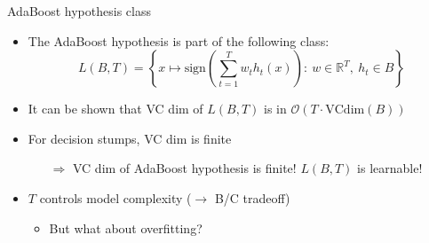 \begin{frame}{AdaBoost hypothesis class}
    \begin{itemize} \pause
        \item The AdaBoost hypothesis is part of the following class:
        \begin{equation*}
            L(B, T) = \left \{ x \mapsto \text{sign} \left( \sum_{t=1}^T w_t h_t(x) \right): \ 
        w \in \mathbb{R}^T, \  h_t \in B \right \}
        \end{equation*} \pause
        \item It can be shown that VC dim of $L(B, T)$ is in 
            $\mathcal{O}(T \cdot \text{VCdim}(B))$ \pause
        \item For decision stumps, VC dim is finite \pause
        \begin{itemize}
            \item[$\Rightarrow$] VC dim of AdaBoost hypothesis is finite! $L(B, T)$ is learnable!
        \end{itemize} \pause
        \item $T$ controls model complexity ($\rightarrow$ B/C tradeoff)
        \begin{itemize}
            \item But what about overfitting?
        \end{itemize}
    \end{itemize}
\end{frame}